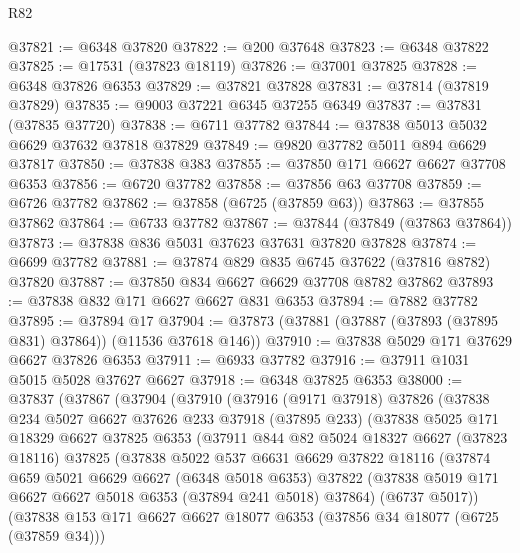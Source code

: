 \begin{lexlean}{R82}
\begin{coremodule}
@37821 := @6348 @37820
@37822 := @200 @37648
@37823 := @6348 @37822
@37825 := @17531 (@37823 @18119)
@37826 := @37001 @37825
@37828 := @6348 @37826 @6353
@37829 := @37821 @37828
@37831 := @37814 (@37819 @37829)
@37835 := @9003 @37221 @6345 @37255 @6349
@37837 := @37831 (@37835 @37720)
@37838 := @6711 @37782
@37844 := @37838 @5013 @5032 @6629 @37632 @37818 @37829
@37849 := @9820 @37782 @5011 @894 @6629 @37817
@37850 := @37838 @383
@37855 := @37850 @171 @6627 @6627 @37708 @6353
@37856 := @6720 @37782
@37858 := @37856 @63 @37708
@37859 := @6726 @37782
@37862 := @37858 (@6725 (@37859 @63))
@37863 := @37855 @37862
@37864 := @6733 @37782
@37867 := @37844 (@37849 (@37863 @37864))
@37873 := @37838 @836 @5031 @37623 @37631 @37820 @37828
@37874 := @6699 @37782
@37881 := @37874 @829 @835 @6745 @37622 (@37816 @8782) @37820
@37887 := @37850 @834 @6627 @6629 @37708 @8782 @37862
@37893 := @37838 @832 @171 @6627 @6627 @831 @6353
@37894 := @7882 @37782
@37895 := @37894 @17
@37904 := @37873 (@37881 (@37887 (@37893 (@37895 @831) @37864)) (@11536 @37618 @146))
@37910 := @37838 @5029 @171 @37629 @6627 @37826 @6353
@37911 := @6933 @37782
@37916 := @37911 @1031 @5015 @5028 @37627 @6627
@37918 := @6348 @37825 @6353
@38000 := @37837
    (@37867
      (@37904
        (@37910
          (@37916
            (@9171 @37918)
            @37826
            (@37838
              @234
              @5027
              @6627
              @37626
              @233
              @37918
              (@37895 @233)
              (@37838
                @5025
                @171
                @18329
                @6627
                @37825
                @6353
                (@37911
                  @844
                  @82
                  @5024
                  @18327
                  @6627
                  (@37823 @18116)
                  @37825
                  (@37838
                    @5022
                    @537
                    @6631
                    @6629
                    @37822
                    @18116
                    (@37874
                      @659
                      @5021
                      @6629
                      @6627
                      (@6348 @5018 @6353)
                      @37822
                      (@37838 @5019 @171 @6627 @6627 @5018 @6353 (@37894 @241 @5018) @37864)
                      (@6737 @5017))
                    (@37838
                      @153
                      @171
                      @6627
                      @6627
                      @18077
                      @6353
                      (@37856 @34 @18077 (@6725 (@37859 @34)))

\end{coremodule}
\end{lexlean}
